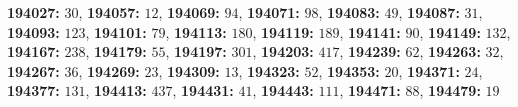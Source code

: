 \textsf{\bfseries 194027:} $30$, \textsf{\bfseries 194057:} $12$, \textsf{\bfseries 194069:} $94$, \textsf{\bfseries 194071:} $98$, \textsf{\bfseries 194083:} $49$, \textsf{\bfseries 194087:} $31$, \textsf{\bfseries 194093:} $123$, \textsf{\bfseries 194101:} $79$, \textsf{\bfseries 194113:} $180$, \textsf{\bfseries 194119:} $189$, \textsf{\bfseries 194141:} $90$, \textsf{\bfseries 194149:} $132$, \textsf{\bfseries 194167:} $238$, \textsf{\bfseries 194179:} $55$, \textsf{\bfseries 194197:} $301$, \textsf{\bfseries 194203:} $417$, \textsf{\bfseries 194239:} $62$, \textsf{\bfseries 194263:} $32$, \textsf{\bfseries 194267:} $36$, \textsf{\bfseries 194269:} $23$, \textsf{\bfseries 194309:} $13$, \textsf{\bfseries 194323:} $52$, \textsf{\bfseries 194353:} $20$, \textsf{\bfseries 194371:} $24$, \textsf{\bfseries 194377:} $131$, \textsf{\bfseries 194413:} $437$, \textsf{\bfseries 194431:} $41$, \textsf{\bfseries 194443:} $111$, \textsf{\bfseries 194471:} $88$, \textsf{\bfseries 194479:} $19$